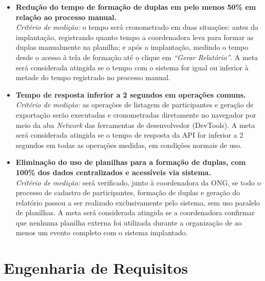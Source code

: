 \documentclass[12pt,a4paper]{article}
\begin{document}
\begin{itemize}

    \item \textbf{Redução do tempo de formação de duplas em pelo menos 50\%
    em relação ao processo manual.} \\
    \textit{Critério de medição:} o tempo será cronometrado em duas situações: antes da implantação, registrando quanto tempo a coordenadora leva para formar as duplas manualmente na planilha; e após a implantação, medindo o tempo desde o acesso à tela de formação até o clique em \textit{``Gerar Relatório''}. A meta será considerada atingida se o tempo com o sistema for igual ou inferior à metade do tempo registrado no processo manual.

    \item \textbf{Tempo de resposta inferior a 2 segundos em operações comuns.} \\
    \textit{Critério de medição:} as operações de listagem de participantes e geração de exportação serão executadas e cronometradas diretamente no navegador por meio da aba \textit{Network} das ferramentas de desenvolvedor (DevTools). A meta será considerada atingida se o tempo de resposta da API for inferior a 2 segundos em todas as operações medidas, em condições normais de uso.

    \item \textbf{Eliminação do uso de planilhas para a formação de duplas, com 100\% dos dados centralizados e acessíveis via sistema.} \\
    \textit{Critério de medição:} será verificado, junto à coordenadora da ONG, se todo o processo de cadastro de participantes, formação de duplas e geração do relatório passou a ser realizado exclusivamente pelo sistema, sem uso paralelo de planilhas. A meta será considerada atingida se a coordenadora confirmar que nenhuma planilha externa foi utilizada durante a organização de ao menos um evento completo com o sistema implantado.

\end{itemize}

\section{Engenharia de Requisitos}

\end{document}
